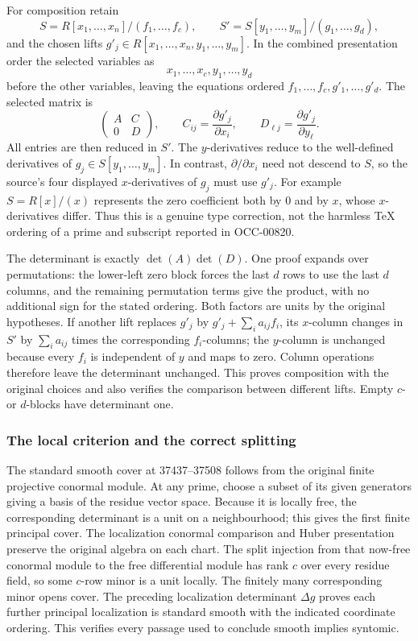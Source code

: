 For composition retain \[
S=R[x_1,\ldots,x_n]/(f_1,\ldots,f_c),\qquad
S'=S[y_1,\ldots,y_m]/(g_1,\ldots,g_d),
\] and the chosen lifts \(g'_j\in R[x_1,\ldots,x_n,y_1,\ldots,y_m]\). In the combined presentation order the selected variables as \[
x_1,\ldots,x_c,y_1,\ldots,y_d
\] before the other variables, leaving the equations ordered \(f_1,\ldots,f_c,g'_1,\ldots,g'_d\). The selected matrix is \[
\begin{pmatrix}
A&C\\0&D
\end{pmatrix},
\qquad
C_{ij}=\frac{\partial g'_j}{\partial x_i},\qquad
D_{\ell j}=\frac{\partial g'_j}{\partial y_\ell}.
\] All entries are then reduced in \(S'\). The \(y\)-derivatives reduce to the well-defined derivatives of \(g_j\in S[y_1,\ldots,y_m]\). In contrast, \(\partial/\partial x_i\) need not descend to \(S\), so the source's four displayed \(x\)-derivatives of \(g_j\) must use \(g'_j\). For example \(S=R[x]/(x)\) represents the zero coefficient both by \(0\) and by \(x\), whose \(x\)-derivatives differ. Thus this is a genuine type correction, not the harmless TeX ordering of a prime and subscript reported in OCC-00820.

The determinant is exactly \(\det(A)\det(D)\). One proof expands over permutations: the lower-left zero block forces the last \(d\) rows to use the last \(d\) columns, and the remaining permutation terms give the product, with no additional sign for the stated ordering. Both factors are units by the original hypotheses. If another lift replaces \(g'_j\) by \(g'_j+\sum_i a_{ij}f_i\), its \(x\)-column changes in \(S'\) by \(\sum_i a_{ij}\) times the corresponding \(f_i\)-columns; the \(y\)-column is unchanged because every \(f_i\) is independent of \(y\) and maps to zero. Column operations therefore leave the determinant unchanged. This proves composition with the original choices and also verifies the comparison between different lifts. Empty \(c\)- or \(d\)-blocks have determinant one.

\subsubsection{The local criterion and the correct splitting}\label{algebra-proof-047-the-local-criterion-and-the-correct-splitting}

The standard smooth cover at 37437--37508 follows from the original finite projective conormal module. At any prime, choose a subset of its given generators giving a basis of the residue vector space. Because it is locally free, the corresponding determinant is a unit on a neighbourhood; this gives the first finite principal cover. The localization conormal comparison and Huber presentation preserve the original algebra on each chart. The split injection from that now-free conormal module to the free differential module has rank \(c\) over every residue field, so some \(c\)-row minor is a unit locally. The finitely many corresponding minor opens cover. The preceding localization determinant \(\Delta g\) proves each further principal localization is standard smooth with the indicated coordinate ordering. This verifies every passage used to conclude smooth implies syntomic.

